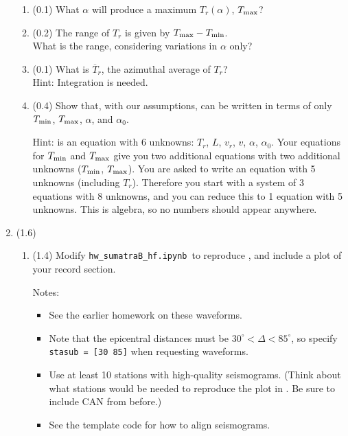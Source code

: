 \documentclass[11pt,titlepage,fleqn]{article}
\newcommand{\tfilehf}{{\tt hw\_sumatraB\_hf.ipynb}}
\begin{document}
\begin{enumerate}
\begin{enumerate}
\item (0.1) What $\alpha$ will produce a maximum $T_r(\alpha)$, $T_{\rm max}$?
\item (0.2) The range of $T_r$ is given by $T_{\rm max} - T_{\rm min}$. \\
What is the range, considering variations in $\alpha$ only?
\item (0.1) What is $\overline{T}_r$, the azimuthal average of $T_r$? \\
Hint: Integration is needed.
\item (0.4) Show that, with our assumptions,  can be written in terms of only $T_{\rm min}$, $T_{\rm max}$, $\alpha$, and $\alpha_0$.

Hint:  is an equation with 6 unknowns: $T_r$, $L$, $v_r$, $v$, $\alpha$, $\alpha_0$. Your equations for $T_{\rm min}$ and $T_{\rm max}$ give you two additional equations with two additional unknowns ($T_{\rm min}$, $T_{\rm max}$). You are asked to write an equation with 5 unknowns (including $T_r$). Therefore you start with a system of 3 equations with 8 unknowns, and you can reduce this to 1 equation with 5 unknowns. This is algebra, so no numbers should appear anywhere.

\end{enumerate}


\item (1.6) 
\begin{enumerate}
\item (1.4) Modify \tfilehf\ to reproduce \citet[][Figure~1d]{Ni2005}, and include a plot of your record section.

Notes:
%
\begin{itemize}
\item See the earlier homework on these waveforms.

\item Note that the epicentral distances must be $30^\circ < \Delta < 85^\circ$, so specify \\
\verb+stasub = [30 85]+ when requesting waveforms.

\item Use at least 10 stations with high-quality seismograms. (Think about what stations would be needed to reproduce the plot in \citet{Ni2005}. Be sure to include CAN from before.)

\item See the template code for how to align seismograms.


\end{itemize}
\end{enumerate}
\end{enumerate}
\end{document}
